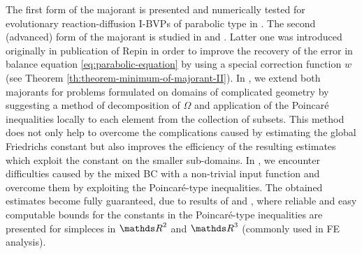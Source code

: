 The first form of the majorant is presented and numerically tested for evolutionary 
reaction-diffusion I-BVPs of parabolic type in \cite{RefMatculevichRepin2014}. 
The second (advanced) form of the majorant is studied in 
\cite{RefMatculevichNeitaanmakiRepin2015} and \cite{RefMatculevichRepinPoincare2014}. 
Latter one was introduced originally in publication of Repin \cite{Repin2002} in order 
to improve the recovery of the error in balance equation \eqref{eq:parabolic-equation} 
by using a special correction function $w$ (see 
Theorem \ref{th:theorem-minimum-of-majorant-II}).
In \cite{RefMatculevichNeitaanmakiRepin2015}, we extend both majorants for problems 
formulated on domains of complicated geometry by suggesting a method of decomposition 
of $\Omega$ and application of the Poincar\'{e} inequalities locally to each element
from the collection of subsets. 
%
This method does not only help to overcome the complications caused by estimating the 
global Friedrichs constant but also improves the efficiency of the resulting estimates 
which exploit the constant on the smaller sub-domains. 
In \cite{RefMatculevichRepinPoincare2014}, we encounter difficulties caused by the
mixed BC with a non-trivial input function and overcome them by exploiting the 
Poincar\'{e}-type inequalities. The obtained estimates become fully guaranteed, due 
to results of \cite{NazarovRepin2014} and \cite{RefArxivMatculevichRepin2015}, where 
reliable and easy computable bounds for the constants in the Poincar\'{e}-type 
inequalities are presented for simpleces in $\Rtwo$ and $\Rthree$ (commonly used in FE 
analysis).

